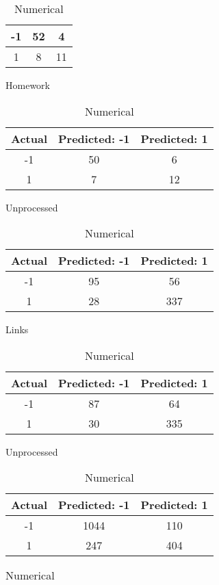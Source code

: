 \begin{table}[!htb]
\begin{minipage}{.5\linewidth}
\begin{tabular}{| c | c | c |}
			-1			& 52			& 4			\\ \hline
			1			& 8				& 11		\\ \hline
		\end{tabular}
	\end{minipage} 	%
	\begin{minipage}{.5\linewidth}
		\caption{Homework}
		\centering
		\begin{tabular}{| c | c | c |}
			\hline
			Actual 		& Predicted: -1	& Predicted: 1	\\ \hline
			-1			& 50			& 6 			\\ \hline
			1			& 7 			& 12			\\ \hline
		\end{tabular}
	\end{minipage}
	\begin{minipage}{.5\linewidth}
		\caption{Unprocessed}
		\centering
		\begin{tabular}{| c | c | c |}
			\hline
			Actual 		& Predicted: -1	& Predicted: 1	\\ \hline
			-1			& 95			& 56			\\ \hline
			1			& 28			& 337			\\ \hline
		\end{tabular}
	\end{minipage}%
	\begin{minipage}{.5\linewidth}
		\centering
		\caption{Links}
		\begin{tabular}{| c | c | c |}
			\hline
			Actual 		& Predicted: -1	& Predicted: 1	\\ \hline
			-1			& 87			& 64			\\ \hline
			1			& 30			& 335			\\ \hline
		\end{tabular}
	\end{minipage} 
	\begin{minipage}{.5\linewidth}
		\caption{Unprocessed}
		\centering
		\begin{tabular}{| c | c | c |}
			\hline
			Actual 		& Predicted: -1	& Predicted: 1	\\ \hline
			-1			& 1044			& 110			\\ \hline
			1			& 247			& 404			\\ \hline
		\end{tabular}
	\end{minipage}%
	\begin{minipage}{.5\linewidth}
		\centering
		\caption{Numerical}
		\begin{tabular}{| c | c | c |}
			\hline

\end{tabular}
\end{minipage}
\end{table}
